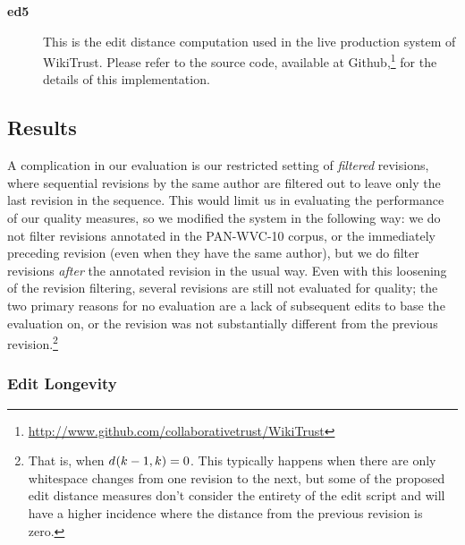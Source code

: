 \begin{description}
\item[\textbf{ed5}] This is the edit distance computation used
    in the live production system of WikiTrust.
    Please refer to the source code, available at
    Github,\footnote{\url{http://www.github.com/collaborativetrust/WikiTrust}}
    for the details of this implementation.

\end{description}

\subsection{Results}

A complication in our evaluation is our restricted setting of
\textit{filtered} revisions, where sequential revisions by the
same author are filtered out to leave only the last revision
in the sequence.
This would limit us in evaluating the performance of our
quality measures, so we modified the system in the following way:
we do not filter revisions annotated in the PAN-WVC-10 corpus,
or the immediately preceding revision (even when they have the
same author), but we do filter revisions \textit{after} the annotated
revision in the usual way.
Even with this loosening of the revision filtering, several
revisions are still not evaluated for quality; the two
primary reasons for no evaluation are a lack of subsequent
edits to base the evaluation on, or the revision was not
substantially different from the previous
revision.\footnote{That is, when $d_{}(k-1,k) = 0$.
This typically happens when there are only whitespace changes
from one revision to the next, but some of the proposed edit distance
measures don't consider the entirety of the edit script and
will have a higher incidence where the distance from the
previous revision is zero.}

\subsubsection{Edit Longevity}



